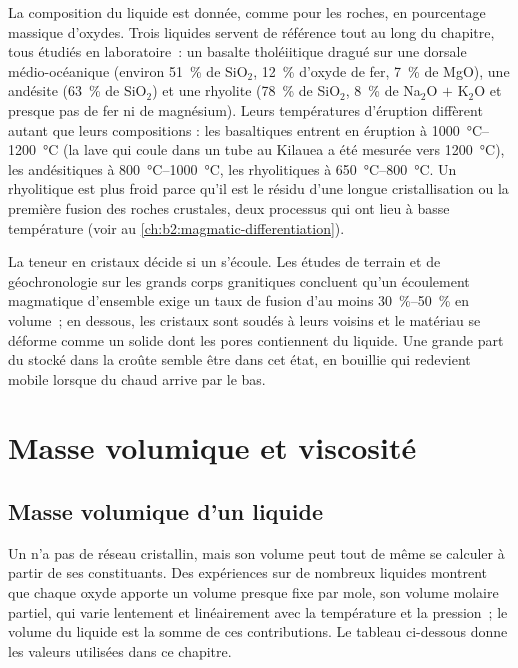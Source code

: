 La composition du liquide est donnée, comme pour les roches, en pourcentage massique
d'oxydes. Trois liquides servent de référence tout au long du chapitre, tous
étudiés en laboratoire~: un basalte tholéiitique dragué sur une dorsale médio-océanique
(environ \qty{51}{\percent} de SiO$_2$, \qty{12}{\percent} d'oxyde de fer, \qty{7}{\percent}
de MgO), une andésite (\qty{63}{\percent} de SiO$_2$) et une rhyolite (\qty{78}{\percent}
de SiO$_2$, \qty{8}{\percent} de Na$_2$O $+$ K$_2$O et presque pas de fer ni de magnésium).
Leurs températures d'éruption diffèrent autant que leurs compositions : les  basaltiques
entrent en éruption à \qtyrange{1000}{1200}{\celsius} (la lave qui coule dans un tube au
Kilauea a été mesurée vers \qty{1200}{\celsius}), les  andésitiques à
\qtyrange{800}{1000}{\celsius}, les  rhyolitiques à \qtyrange{650}{800}{\celsius}.
Un  rhyolitique est plus froid parce qu'il est le résidu d'une longue cristallisation
ou la première fusion des roches crustales, deux processus qui ont lieu à basse température
(voir au \cref{ch:b2:magmatic-differentiation}).

La teneur en cristaux décide si un  s'écoule. Les études de terrain et de géochronologie sur
les grands corps granitiques concluent qu'un écoulement magmatique d'ensemble exige un taux
de fusion d'au moins \qtyrange{30}{50}{\percent} en volume~; en dessous, les cristaux sont soudés
à leurs voisins et le matériau se déforme comme un solide dont les pores contiennent du liquide. Une
grande part du  stocké dans la croûte semble être dans cet état, en bouillie qui redevient
mobile lorsque du  chaud arrive
par le bas.

\section{Masse volumique et viscosité}

\subsection{Masse volumique d'un liquide}

Un  n'a pas de réseau cristallin, mais son volume peut tout de même se
calculer à partir de ses constituants. Des expériences sur de nombreux liquides montrent que chaque oxyde
apporte un volume presque fixe par mole, son volume molaire partiel, qui varie lentement et
linéairement avec la température et la pression~; le volume du liquide est la somme de
ces contributions. Le tableau ci-dessous donne les valeurs utilisées dans ce chapitre.

